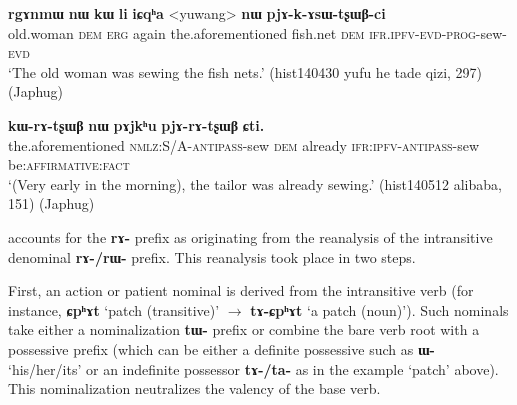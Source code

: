 \documentclass[oneside,a4paper,11pt]{article}
\newcommand{\ipa}[1]{{\phon\textbf{#1}}}
\begin{document}

\begin{exe}
\ex \label{ex:pjAkAsWtsxWBci}
\gll 
\ipa{rgɤnmɯ}	\ipa{nɯ}	\ipa{kɯ}	\ipa{li}	\ipa{iɕqʰa}	<yuwang>	\ipa{nɯ}	\ipa{pjɤ-k-ɤsɯ-tʂɯβ-ci} \\
old.woman \textsc{dem} \textsc{erg} again the.aforementioned fish.net \textsc{dem} \textsc{ifr.ipfv-evd-prog}-sew-\textsc{evd} \\
\glt `The old woman was sewing the fish nets.' (hist140430 yufu he tade qizi, 297) (Japhug)
\end{exe}

\begin{exe}
\ex \label{ex:pjArAtsxWB}
\gll \ipa{iɕqʰa}	\ipa{kɯ-rɤ-tʂɯβ}	\ipa{nɯ}	\ipa{pɤjkʰu}	\ipa{pjɤ-rɤ-tʂɯβ}	\ipa{ɕti.} \\
the.aforementioned \textsc{nmlz:S/A-antipass}-sew  \textsc{dem} already  \textsc{ifr:ipfv-antipass}-sew be:\textsc{affirmative:fact} \\
\glt `(Very early in the morning), the tailor was already sewing.' (hist140512 alibaba, 151) (Japhug)
\end{exe}

\citet{jacques14antipassive} accounts for the \ipa{rɤ-} prefix as originating from the reanalysis of the intransitive denominal \ipa{rɤ-/rɯ-} prefix. This reanalysis took place in two steps. 

First, an action or patient nominal is derived from the intransitive verb (for instance, \ipa{ɕpʰɤt} `patch (transitive)' $\rightarrow$  \ipa{tɤ-ɕpʰɤt} `a patch (noun)'). Such nominals take either a nominalization \ipa{tɯ-} prefix or combine the bare verb root with a possessive prefix (which can be either a definite possessive such as \ipa{ɯ-} `his/her/its' or an indefinite possessor \ipa{tɤ-/ta-} as in the example `patch' above). This nominalization neutralizes the valency of the base verb.
\end{document}
